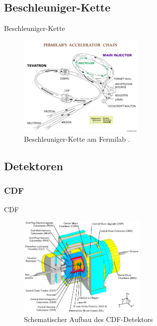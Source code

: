 \documentclass[aspectratio=1610, 9pt]{beamer}
\begin{document}
\subsection{Beschleuniger-Kette}

\begin{frame}{Beschleuniger-Kette}
  \begin{figure}
    \includegraphics[width=0.54\textwidth]{images/accelerator_chain.jpg}
    \caption{Beschleuniger-Kette am Fermilab \cite{accelerator_chain}.}
  \end{figure}
\end{frame}

\subsection{Detektoren}

\subsubsection{CDF}

\begin{frame}{CDF}
    \begin{figure}
      \includegraphics[width=0.55\textwidth]{images/CDF.png}
      \caption{Schematischer Aufbau des CDF-Detektors \cite{CDF_aufbau}}
    \end{figure}
\end{frame}
\end{document}
